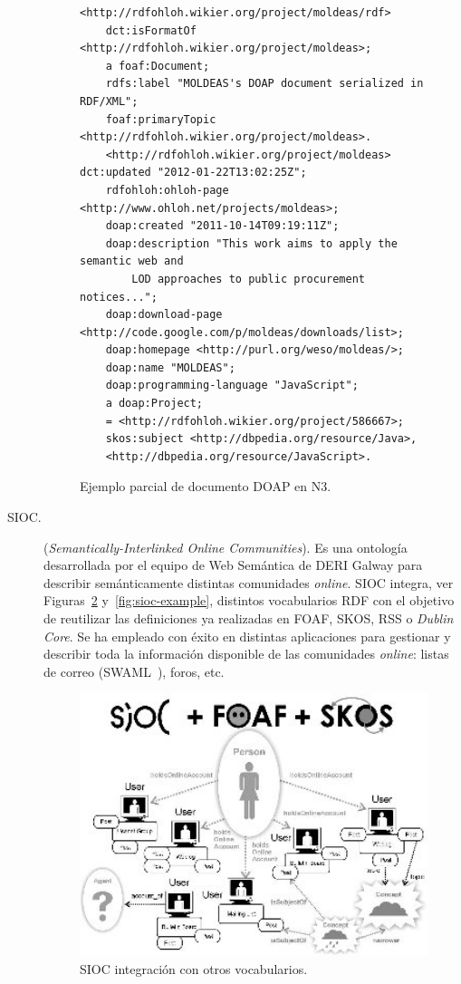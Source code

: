 \begin{description}
\begin{figure}[!htbp]
\centering
  \begin{lstlisting}
<http://rdfohloh.wikier.org/project/moldeas/rdf> 
	dct:isFormatOf 	<http://rdfohloh.wikier.org/project/moldeas>;
	a foaf:Document;
	rdfs:label "MOLDEAS's DOAP document serialized in RDF/XML";
	foaf:primaryTopic <http://rdfohloh.wikier.org/project/moldeas>.
	<http://rdfohloh.wikier.org/project/moldeas> dct:updated "2012-01-22T13:02:25Z";
	rdfohloh:ohloh-page <http://www.ohloh.net/projects/moldeas>;
	doap:created "2011-10-14T09:19:11Z";
	doap:description "This work aims to apply the semantic web and 
	    LOD approaches to public procurement notices...";
	doap:download-page <http://code.google.com/p/moldeas/downloads/list>;
	doap:homepage <http://purl.org/weso/moldeas/>;
	doap:name "MOLDEAS";
	doap:programming-language "JavaScript";
	a doap:Project;
	= <http://rdfohloh.wikier.org/project/586667>;
	skos:subject <http://dbpedia.org/resource/Java>, 
	<http://dbpedia.org/resource/JavaScript>.
  \end{lstlisting}
\caption{Ejemplo parcial de documento DOAP en N3.}
\label{fig:doap-example}
\end{figure}

\item[\gls{SIOC}.] (\textit{Semantically-Interlinked Online Communities}). Es una ontología desarrollada 
por el equipo de Web Semántica de DERI Galway para describir semánticamente
distintas comunidades \textit{online}. SIOC integra, ver Figuras~\ref{fig:sioc} y~\ref{fig:sioc-example}, distintos vocabularios RDF con el
objetivo de reutilizar las definiciones ya realizadas en \gls{FOAF}, \gls{SKOS},
\gls{RSS} o \textit{Dublin Core}. Se ha empleado con éxito en distintas aplicaciones para gestionar y
describir toda la información disponible de las comunidades \textit{online}: listas de correo (SWAML~\cite{Sergio}), 
foros, etc.
 
\begin{figure}[!htb]
\centering
	\includegraphics[width=12cm]{images/sioc}
\caption{SIOC integración con otros vocabularios.}
\label{fig:sioc}
\end{figure}


\end{description}
